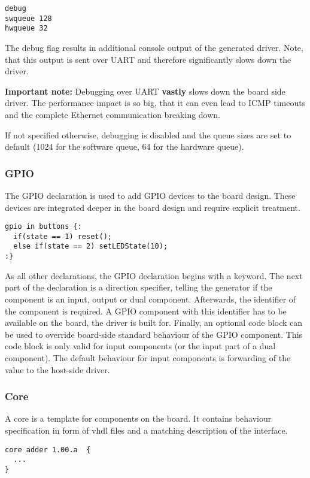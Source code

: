 \documentclass{report}
\begin{document}
\begin{lstlisting}[language=bdl]
debug
swqueue 128
hwqueue 32
\end{lstlisting}

The debug flag results in additional console output of the generated driver. Note, that this output is sent over UART and therefore significantly slows down the driver.

\textbf{Important note:} Debugging over UART \textbf{vastly} slows down the board side driver. The performance impact is so big, that it can even lead to ICMP timeouts and the complete Ethernet communication breaking down.

If not specified otherwise, debugging is disabled and the queue sizes are set to default (1024 for the software queue, 64 for the hardware queue).

\subsubsection{GPIO}
The GPIO declaration is used to add GPIO devices to the board design. These devices are integrated deeper in the board design and require explicit treatment.

\begin{lstlisting}[language=bdl]
gpio in buttons {:
  if(state == 1) reset();
  else if(state == 2) setLEDState(10);
:}
\end{lstlisting}

As all other declarations, the GPIO declaration begins with a keyword. The next part of the declaration is a direction specifier, telling the generator if the component is an input, output or dual component.
Afterwards, the identifier of the component is required. A GPIO component with this identifier has to be available on the board, the driver is built for.
Finally, an optional code block can be used to override board-side standard behaviour of the GPIO component. This code block is only valid for input components (or the input part of a dual component). The default behaviour for input components is forwarding of the value to the host-side driver.

\subsubsection{Core}
A core is a template for components on the board. It contains behaviour specification in form of vhdl files and a matching description of the interface.

\begin{lstlisting}[language=bdl]
core adder 1.00.a  {
  ...
}
\end{lstlisting}
\end{document}
